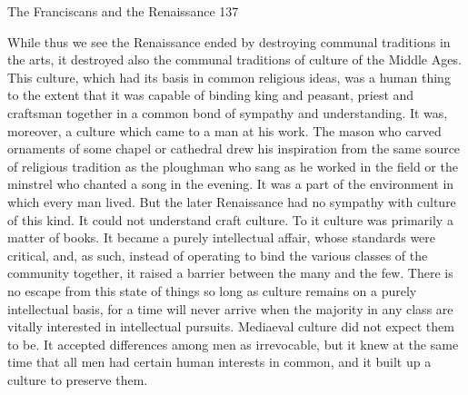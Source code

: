 \documentclass{book}
\begin{document}
The Franciscans and the Renaissance 137

While thus we see the Renaissance ended by destroying communal traditions in the arts, it destroyed also the communal traditions of culture of the Middle Ages. This culture, which had its basis in common religious ideas, was a human thing to the extent that it was capable of binding king and peasant, priest and craftsman together in a common bond of sympathy and understanding. It was, moreover, a culture which came to a man at his work. The mason who carved ornaments of some chapel or cathedral drew his inspiration from the same source of religious tradition as the ploughman who sang as he worked in the field or the minstrel who chanted a song in the evening. It was a part of the environment in which every man lived. But the later Renaissance had no sympathy with culture of this kind. It could not understand craft culture. To it culture was primarily a matter of books. It became a purely intellectual affair, whose standards were critical, and, as such, instead of operating to bind the various classes of the community together, it raised a barrier between the many and the few. There is no escape from this state of things so long as culture remains on a purely intellectual basis, for a time will never arrive when the majority in any class are vitally interested in intellectual pursuits. Mediaeval culture did not expect them to be. It accepted differences among men as irrevocable, but it knew at the same time that all men had certain human interests in common, and it built up a culture to preserve them.
\end{document}
